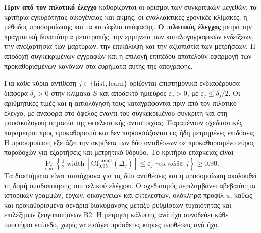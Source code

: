 \documentclass[11pt,a4paper]{article}
\begin{document}
\textbf{Πριν από τον πιλοτικό έλεγχο} καθορίζονται οι ορισμοί των συγκριτικών μεγεθών, τα κριτήρια εγκυρότητας οικογένειας και ακμής, οι εναλλακτικές χρονικές κλίμακες, η μέθοδος προσομοίωσης και τα κατώφλια απόφασης. \textbf{Ο πιλοτικός έλεγχος} μετρά την πραγματική δυνατότητα μετατροπής, την ερμηνεία των καταλογογραφικών ενδείξεων, την ανεξαρτησία των μαρτύρων, την επικάλυψη και την αξιοπιστία των μετρήσεων. Η αποδοχή συγκεκριμένων εγγραφών και η επιλογή επιπέδου αποτελούν εφαρμογή των προκαθορισμένων κανόνων στα ευρήματα αυτής της απογραφής.

Για κάθε κύρια αντίθεση $j\in\{\mathrm{hist},\mathrm{learn}\}$ ορίζονται επιστημονικά ενδιαφέρουσα διαφορά $\delta_j>0$ στην κλίμακα $S$ και αποδεκτό ημιεύρος $\varepsilon_j>0$, με $\varepsilon_j\leq\delta_j/2$. Οι αριθμητικές τιμές και η αιτιολόγησή τους καταγράφονται πριν από τον πιλοτικό έλεγχο, με αναφορά στο όφελος έναντι του συγκεκριμένου συγκριτή και στη μουσικολογική σημασία της εκτελεστικής αντιστοιχίας. Παραμένουν σχεδιαστικές παράμετροι προς προκαθορισμό και δεν παρουσιάζονται ως ήδη μετρημένες επιδόσεις. Η προσομοίωση εξετάζει την ακρίβεια των δύο αντιθέσεων σε προκαθορισμένο εύρος παραδοχών για εξαρτήσεις και μετρητικό θόρυβο. Το κριτήριο επάρκειας είναι
\[
\Pr_{\mathrm{sim}}\!\left\{
\tfrac12\operatorname{width}\!\left[\mathrm{CI}_{0.95}^{\mathrm{simult}}(\Delta_j)\right]
\leq\varepsilon_j\ \text{για κάθε }j
\right\}\geq 0.90.
\]
Τα διαστήματα είναι ταυτόχρονα για τις δύο αντιθέσεις και η προσομοίωση ακολουθεί τη δομή ομαδοποίησης του τελικού ελέγχου. Ο σχεδιασμός περιλαμβάνει αβεβαιότητα ιστορικών γραμμών, έργων, οικογενειών και εκτελεστών, ολόκληρα προφίλ $u$, καθώς και προκαθορισμένα σενάρια διακύμανσης μεταξύ ρυθμίσεων τυχαιότητας και επιλέξιμων ζευγοποιήσεων B2. Η μέτρηση κάλυψης ανά ήχο συνοδεύει κάθε υποψήφιο επίπεδο, χωρίς να εισάγει πρόσθετες κύριες υποθέσεις ανά ήχο.
\end{document}
